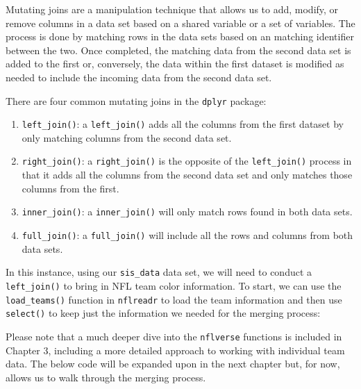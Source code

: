 \documentclass[
  letterpaper,
]{krantz}
\providecommand{\tightlist}{%
  \setlength{\itemsep}{0pt}\setlength{\parskip}{0pt}}\usepackage{longtable,booktabs,array}
\begin{document}
Mutating joins are a manipulation technique that allows us to add,
modify, or remove columns in a data set based on a shared variable or a
set of variables. The process is done by matching rows in the data sets
based on an matching identifier between the two. Once completed, the
matching data from the second data set is added to the first or,
conversely, the data within the first dataset is modified as needed to
include the incoming data from the second data set.

There are four common mutating joins in the \texttt{dplyr} package:

\begin{enumerate}
\def\labelenumi{\arabic{enumi}.}
\tightlist
\item
  \texttt{left\_join()}: a \texttt{left\_join()} adds all the columns
  from the first dataset by only matching columns from the second data
  set.
\item
  \texttt{right\_join()}: a \texttt{right\_join()} is the opposite of
  the \texttt{left\_join()} process in that it adds all the columns from
  the second data set and only matches those columns from the first.
\item
  \texttt{inner\_join()}: a \texttt{inner\_join()} will only match rows
  found in both data sets.
\item
  \texttt{full\_join()}: a \texttt{full\_join()} will include all the
  rows and columns from both data sets.
\end{enumerate}

In this instance, using our \texttt{sis\_data} data set, we will need to
conduct a \texttt{left\_join()} to bring in NFL team color information.
To start, we can use the \texttt{load\_teams()} function in
\texttt{nflreadr} to load the team information and then use
\texttt{select()} to keep just the information we needed for the merging
process:

\begin{tcolorbox}[enhanced jigsaw, left=2mm, toprule=.15mm, opacitybacktitle=0.6, leftrule=.75mm, bottomrule=.15mm, colbacktitle=quarto-callout-note-color!10!white, breakable, colback=white, bottomtitle=1mm, toptitle=1mm, title=\textcolor{quarto-callout-note-color}{\faInfo}\hspace{0.5em}{Note}, coltitle=black, titlerule=0mm, arc=.35mm, opacityback=0, colframe=quarto-callout-note-color-frame, rightrule=.15mm]

Please note that a much deeper dive into the \texttt{nflverse} functions
is included in Chapter 3, including a more detailed approach to working
with individual team data. The below code will be expanded upon in the
next chapter but, for now, allows us to walk through the merging
process.

\end{tcolorbox}
\end{document}
